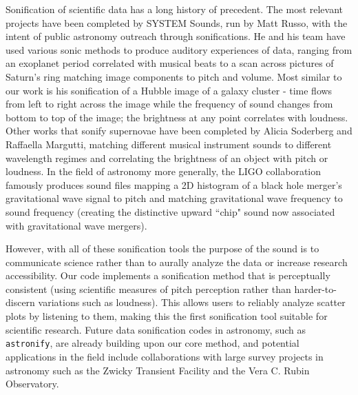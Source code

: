 \documentclass[]{acmsiggraph}
\begin{document}
Sonification of scientific data has a long history of precedent. The most relevant projects have been completed by SYSTEM Sounds, run by Matt Russo, with the intent of public astronomy outreach through sonifications. He and his team have used various sonic methods to produce auditory experiences of data, ranging from an exoplanet period correlated with musical beats to a scan across pictures of Saturn's ring matching image components to pitch and volume. Most similar to our work is his sonification of a Hubble image of a galaxy cluster - time flows from left to right across the image while the frequency of sound changes from bottom to top of the image; the brightness at any point correlates with loudness. Other works that sonify supernovae have been completed by Alicia Soderberg and Raffaella Margutti, matching different musical instrument sounds to different wavelength regimes and correlating the brightness of an object with pitch or loudness. In the field of astronomy more generally, the LIGO collaboration famously produces sound files mapping a 2D histogram of a black hole merger's gravitational wave signal to pitch and matching gravitational wave frequency to sound frequency (creating the distinctive upward ``chip" sound now associated with gravitational wave mergers).

However, with all of these sonification tools the purpose of the sound is to communicate science rather than to aurally analyze the data or increase research accessibility. Our code implements a sonification method that is perceptually consistent (using scientific measures of pitch perception rather than harder-to-discern variations such as loudness). This allows users to reliably analyze scatter plots by listening to them, making this the first sonification tool suitable for scientific research. Future data sonification codes in astronomy, such as \texttt{astronify}, are already building upon our core method, and potential applications in the field include collaborations with large survey projects in astronomy such as the Zwicky Transient Facility and the Vera C. Rubin Observatory.


\end{document}
